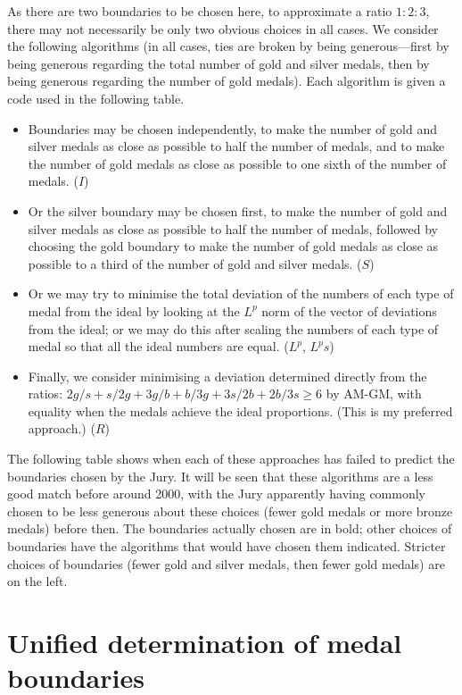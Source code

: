 \documentclass[a4paper,10pt]{article}
\begin{document}
As there are two boundaries to be chosen here, to approximate a ratio
$1:2:3$, there may not necessarily be only two obvious choices in all
cases.  We consider the following algorithms (in all cases, ties are
broken by being generous---first by being generous regarding the total
number of gold and silver medals, then by being generous regarding the
number of gold medals).  Each algorithm is given a code used in the
following table.

\begin{itemize}
\item Boundaries may be chosen independently, to make the number of
  gold and silver medals as close as possible to half the number of
  medals, and to make the number of gold medals as close as possible
  to one sixth of the number of medals.  ($I$)
\item Or the silver boundary may be chosen first, to make the number
  of gold and silver medals as close as possible to half the number of
  medals, followed by choosing the gold boundary to make the number of
  gold medals as close as possible to a third of the number of gold
  and silver medals.  ($S$)
\item Or we may try to minimise the total deviation of the numbers of
  each type of medal from the ideal by looking at the $L^p$ norm of
  the vector of deviations from the ideal; or we may do this after
  scaling the numbers of each type of medal so that all the ideal
  numbers are equal.  ($L^p$, $L^ps$)
\item Finally, we consider minimising a deviation determined directly
  from the ratios: $2g/s + s/2g + 3g/b + b/3g + 3s/2b + 2b/3s \ge 6$
  by AM-GM, with equality when the medals achieve the ideal
  proportions.  (This is my preferred approach.)  ($R$)
\end{itemize}

The following table shows when each of these
approaches has failed to predict the boundaries chosen by the Jury.
It will be seen that these algorithms are a less good match before
around 2000, with the Jury apparently having commonly chosen to be
less generous about these choices (fewer gold medals or more bronze
medals) before then.  The boundaries actually chosen are in bold;
other choices of boundaries have the algorithms that would have chosen
them indicated.  Stricter choices of boundaries (fewer gold and silver
medals, then fewer gold medals) are on the left.



\section*{Unified determination of medal boundaries}
\end{document}
